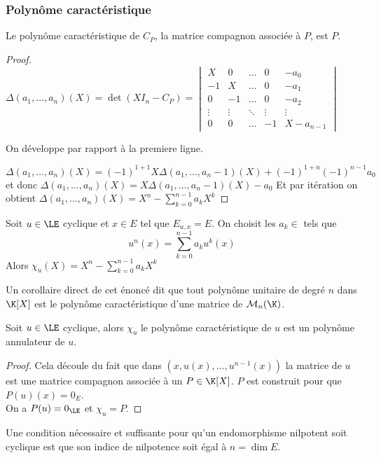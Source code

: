 \subsubsection{Polynôme caractéristique }

\begin{prop}
	Le polynôme caractéristique de $C_P$, la matrice compagnon associée à $P$, est $P$.
\end{prop}

\begin{proof}
	$\Delta(a_1, \ldots, a_n)(X) = \det (XI_n - C_P) =
		\begin{vmatrix}
			X      & 0      & \ldots & 0      & -a_0      \\
			-1     & X      & \ldots & 0      & -a_1      \\
			0      & -1     & \ldots & 0      & -a_2      \\
			\vdots & \vdots & \ddots & \vdots & \vdots    \\
			0      & 0      & \ldots & -1     & X-a_{n-1}
		\end{vmatrix}$

	On développe par rapport à la premiere ligne.

	$$ \Delta(a_1, \ldots, a_n)(X) = (-1)^{1+1}X\Delta(a_1, \ldots, a_n-1)(X) + (-1)^{1+n}(-1)^{n-1}a_0$$
	et donc $\Delta(a_1, \ldots, a_n)(X) = X\Delta(a_1, \ldots, a_n-1)(X) - a_0 $
	Et par itération on obtient $\Delta(a_1, \ldots, a_n)(X) = X^n - \sum_{k=0}^{n-1} a_k X^k$
\end{proof}



\begin{prop}
	Soit $u \in \LE$ cyclique et $x \in E$ tel que $E_{u,x} = E$. On choisit les $a_k \in $ tels que
	$$u^n(x) = \sum_{k=0}^{n-1} a_k u^k(x)$$
	Alors $\chi_u (X) = X^n - \sum_{k=0}^{n-1} a_k X^k$
\end{prop}

\begin{remarque}
	Un corollaire direct de cet énoncé dit que tout polynôme unitaire de degré $n$ dans $\K[X]$ est le polynôme caractéristique
	d'une matrice de $\mathcal{M}_n(\K)$.
\end{remarque}

\begin{theorem}
	Soit $u \in \LE$ cyclique, alors $\chi_u $ le polynôme caractéristique de $u$ est un
	polynôme annulateur de $u$.
\end{theorem}

\begin{proof}
	Cela découle du fait que dans $(x, u(x), \ldots, u^{n-1}(x))$ la matrice de $u$ est une matrice compagnon associée à un $P \in \K[X]$.
	$P$ est construit pour que $P(u)(x) = 0_E$.\\
	On a $P(u) = 0_{\LE}$ et $\chi_u = P$.
\end{proof}


\begin{exemple}
	Une condition nécessaire et suffisante pour qu'un endomorphisme nilpotent soit cyclique est
	que son indice de nilpotence soit égal à $n = \dim E$.
\end{exemple}

